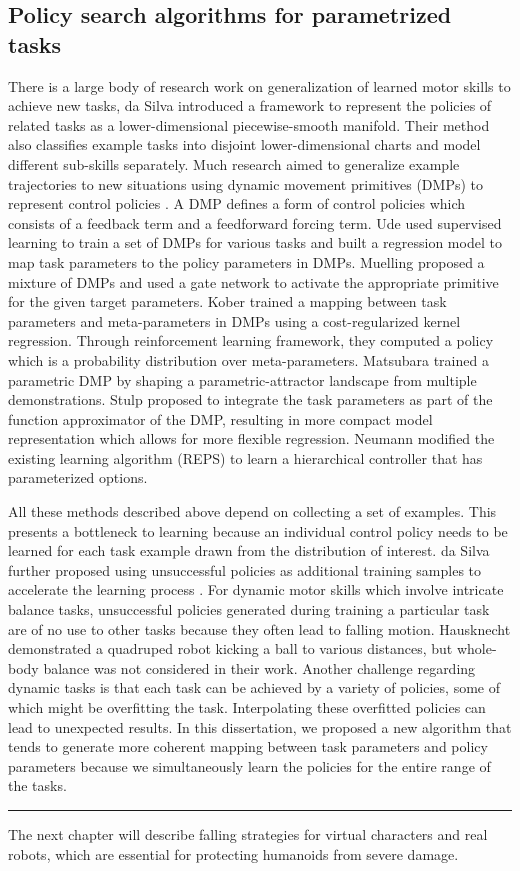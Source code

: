 \subsection{Policy search algorithms for parametrized tasks}
There is a large body of research work on generalization of learned
motor skills to achieve new tasks,
da Silva \etal
\cite{DaSilva:2012:LPS,DaSilva:2014:LPM,DaSilva:2014:ACP} introduced a
framework to represent the policies of related tasks as a
lower-dimensional piecewise-smooth manifold. Their method also
classifies example tasks into disjoint lower-dimensional charts and
model different sub-skills separately. Much research aimed to
generalize example trajectories to new situations using dynamic
movement primitives (DMPs) to represent control policies
\cite{Ijspeert:2002:LAL}. A DMP defines a form of control policies
which consists of a feedback term and a feedforward forcing
term. Ude \etal \cite{Ude:2010:TSG} used supervised learning to train a set of
DMPs for various tasks and built a regression model to map task
parameters to the policy parameters in DMPs. 
Muelling \etal \cite{Muelling:2010:LTT}
proposed a mixture of DMPs and used a gate network to activate the
appropriate primitive for the given target parameters.
Kober \etal \cite{Kober:2010:RLA} trained a mapping between task parameters and
meta-parameters in DMPs using a cost-regularized kernel
regression. Through reinforcement learning framework, they computed a
policy which is a probability distribution over meta-parameters.
Matsubara \etal \cite{Matsubara:2011:LPD} trained a parametric DMP by shaping a
parametric-attractor landscape from multiple demonstrations.
Stulp \etal \cite{Stulp:2013:LCP} proposed to integrate the task parameters as
part of the function approximator of the DMP, resulting in more
compact model representation which allows for more flexible
regression. 
Neumann \etal \cite{Neumann:2013:IMS} modified the existing learning
algorithm (REPS) to learn a hierarchical controller that has
parameterized options.

All these methods described above depend on collecting a set of
examples. This presents a bottleneck to learning because an individual
control policy needs to be learned for each task example drawn from
the distribution of interest. da Silva \etal further proposed using
unsuccessful policies as additional training samples to accelerate the
learning process \cite{DaSilva:2014:LPM}. For dynamic motor skills
which involve intricate balance tasks, unsuccessful policies generated
during training a particular task are of no use to other tasks because
they often lead to falling motion. 
Hausknecht \etal \cite{Hausknecht:2010:LPK}
demonstrated a quadruped robot kicking a ball to various distances,
but whole-body balance was not considered in their work.  Another
challenge regarding dynamic tasks is that each task can be achieved by
a variety of policies, some of which might be overfitting the
task. Interpolating these overfitted policies can lead to unexpected
results. In this dissertation, we proposed a new algorithm that
tends to generate more coherent mapping between
task parameters and policy parameters because we simultaneously learn
the policies for the entire range of the tasks.

\rule{\textwidth}{1pt}
The next chapter will describe falling strategies for
virtual characters and real robots, which are essential for
protecting humanoids from severe damage.
